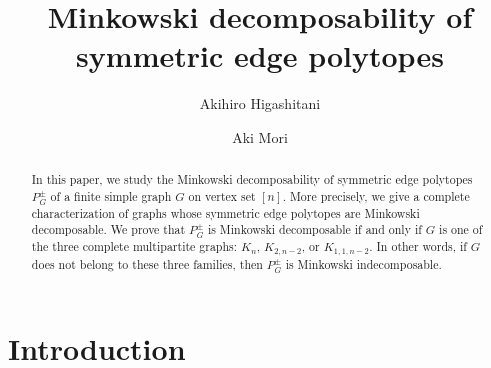 \documentclass[11pt,a4paper]{amsart}
\title[Minkowski decomposability of symmetric edge polytopes]
{Minkowski decomposability of symmetric edge polytopes}
\author{Akihiro Higashitani}
\author{Aki Mori}
\theoremstyle{definition}
\theoremstyle{remark}
\begin{document}
\begin{abstract}
In this paper, we study the Minkowski decomposability of symmetric edge polytopes $P_G^\pm$ of a finite simple graph $G$ on vertex set $[n]$. 
More precisely, we give a complete characterization of graphs whose symmetric edge polytopes are Minkowski decomposable. 
We prove that $P_G^\pm$ is Minkowski decomposable if and only if 
$G$ is one of the three complete multipartite graphs: $K_n$, $K_{2,n-2}$, or $K_{1,1,n-2}$. 
In other words, if $G$ does not belong to these three families, then $P_G^\pm$ is Minkowski indecomposable. 
\end{abstract}

\maketitle

\section{Introduction}
\end{document}
